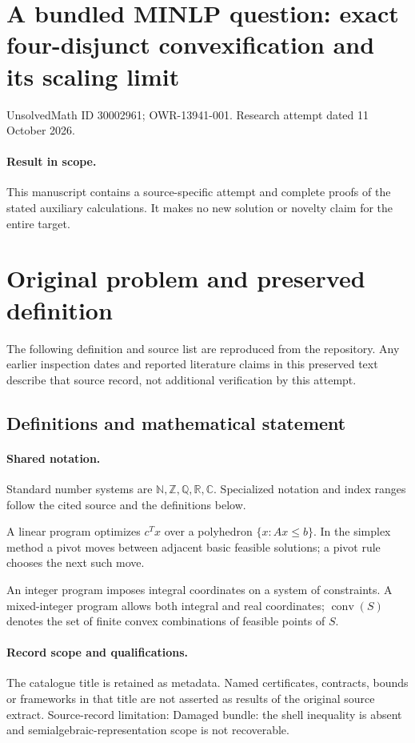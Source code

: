 \documentclass[11pt]{article}
\begin{document}
\section*{A bundled MINLP question: exact four-disjunct convexification and its scaling limit}
\noindent UnsolvedMath ID 30002961; OWR-13941-001. Research attempt dated 11 October 2026.
\paragraph{Result in scope.}This manuscript contains a source-specific attempt and complete proofs of the stated auxiliary calculations. It makes no new solution or novelty claim for the entire target.
\section{Original problem and preserved definition}
The following definition and source list are reproduced from the repository. Any earlier inspection dates and reported literature claims in this preserved text describe that source record, not additional verification by this attempt.
\subsection{Definitions and mathematical statement}

\paragraph{Shared notation.}Standard number systems are $\mathbb N,\mathbb Z,\mathbb Q,\mathbb R,\mathbb C$. Specialized notation and index ranges follow the cited source and the definitions below.


A linear program optimizes $c^Tx$ over a polyhedron $\{x:Ax\leq b\}$. In the simplex method a pivot moves between adjacent basic feasible solutions; a pivot rule chooses the next such move.

An integer program imposes integral coordinates on a system of constraints. A mixed-integer program allows both integral and real coordinates; $\operatorname{conv}(S)$ denotes the set of finite convex combinations of feasible points of $S$.
\paragraph{Record scope and qualifications.}
The catalogue title is retained as metadata. Named certificates, contracts, bounds or frameworks in that title are not asserted as results of the original source extract.
Source-record limitation: Damaged bundle: the shell inequality is absent and semialgebraic-representation scope is not recoverable.
\end{document}
